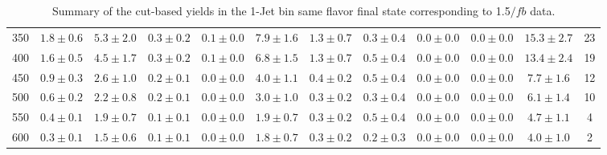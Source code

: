 \begin{table}
{\begin{center}
\begin{tabular}{l c c c c c c c c c c c }
350 & $1.8\pm0.6$ & $5.3\pm2.0$ & $0.3\pm0.2$ & $0.1\pm0.0$ & $7.9\pm1.6$ & $1.3\pm0.7$ & $0.3\pm0.4$ & $0.0\pm0.0$ & $0.0\pm0.0$ & $15.3\pm2.7$ & 23 \\
400 & $1.6\pm0.5$ & $4.5\pm1.7$ & $0.3\pm0.2$ & $0.1\pm0.0$ & $6.8\pm1.5$ & $1.3\pm0.7$ & $0.5\pm0.4$ & $0.0\pm0.0$ & $0.0\pm0.0$ & $13.4\pm2.4$ & 19 \\
450 & $0.9\pm0.3$ & $2.6\pm1.0$ & $0.2\pm0.1$ & $0.0\pm0.0$ & $4.0\pm1.1$ & $0.4\pm0.2$ & $0.5\pm0.4$ & $0.0\pm0.0$ & $0.0\pm0.0$ & $7.7\pm1.6$ & 12 \\
500 & $0.6\pm0.2$ & $2.2\pm0.8$ & $0.2\pm0.1$ & $0.0\pm0.0$ & $3.0\pm1.0$ & $0.3\pm0.2$ & $0.3\pm0.4$ & $0.0\pm0.0$ & $0.0\pm0.0$ & $6.1\pm1.4$ & 10 \\
550 & $0.4\pm0.1$ & $1.9\pm0.7$ & $0.1\pm0.1$ & $0.0\pm0.0$ & $1.9\pm0.7$ & $0.3\pm0.2$ & $0.5\pm0.4$ & $0.0\pm0.0$ & $0.0\pm0.0$ & $4.7\pm1.1$ & 4 \\
600 & $0.3\pm0.1$ & $1.5\pm0.6$ & $0.1\pm0.1$ & $0.0\pm0.0$ & $1.8\pm0.7$ & $0.3\pm0.2$ & $0.2\pm0.3$ & $0.0\pm0.0$ & $0.0\pm0.0$ & $4.0\pm1.0$ & 2 \\
\hline
\end{tabular}
\end{center}
}
\caption{Summary of the cut-based yields in the 1-Jet bin same flavor final state corresponding to 1.5$/fb$ data.}
\end{table}

